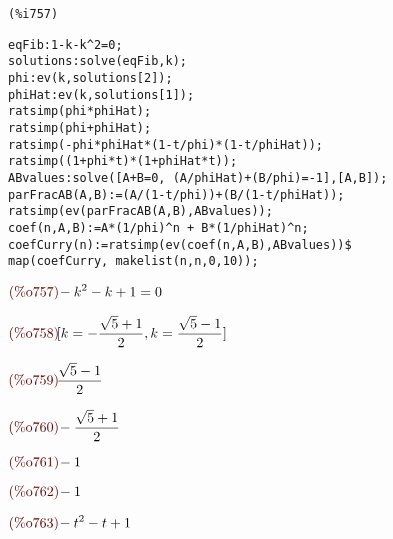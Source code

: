 \noindent
\begin{minipage}[t]{8ex}{\color{red}\bf
\begin{verbatim}
(%i757) 
\end{verbatim}}
\end{minipage}
\begin{minipage}[t]{\textwidth}{\color{blue}
\begin{verbatim}
eqFib:1-k-k^2=0;
solutions:solve(eqFib,k);
phi:ev(k,solutions[2]);
phiHat:ev(k,solutions[1]);
ratsimp(phi*phiHat);
ratsimp(phi+phiHat);
ratsimp(-phi*phiHat*(1-t/phi)*(1-t/phiHat));
ratsimp((1+phi*t)*(1+phiHat*t));
ABvalues:solve([A+B=0, (A/phiHat)+(B/phi)=-1],[A,B]);
parFracAB(A,B):=(A/(1-t/phi))+(B/(1-t/phiHat));
ratsimp(ev(parFracAB(A,B),ABvalues));
coef(n,A,B):=A*(1/phi)^n + B*(1/phiHat)^n;
coefCurry(n):=ratsimp(ev(coef(n,A,B),ABvalues))$
map(coefCurry, makelist(n,n,0,10));
\end{verbatim}}
\end{minipage}
\begin{math}\displaystyle
\parbox{8ex}{\color{labelcolor}(\%o757) }
-{k}^{2}-k+1=0
\end{math}

\begin{math}\displaystyle
\parbox{8ex}{\color{labelcolor}(\%o758) }
[k=-\frac{\sqrt{5}+1}{2},k=\frac{\sqrt{5}-1}{2}]
\end{math}

\begin{math}\displaystyle
\parbox{8ex}{\color{labelcolor}(\%o759) }
\frac{\sqrt{5}-1}{2}
\end{math}

\begin{math}\displaystyle
\parbox{8ex}{\color{labelcolor}(\%o760) }
-\frac{\sqrt{5}+1}{2}
\end{math}

\begin{math}\displaystyle
\parbox{8ex}{\color{labelcolor}(\%o761) }
-1
\end{math}

\begin{math}\displaystyle
\parbox{8ex}{\color{labelcolor}(\%o762) }
-1
\end{math}

\begin{math}\displaystyle
\parbox{8ex}{\color{labelcolor}(\%o763) }
-{t}^{2}-t+1
\end{math}

